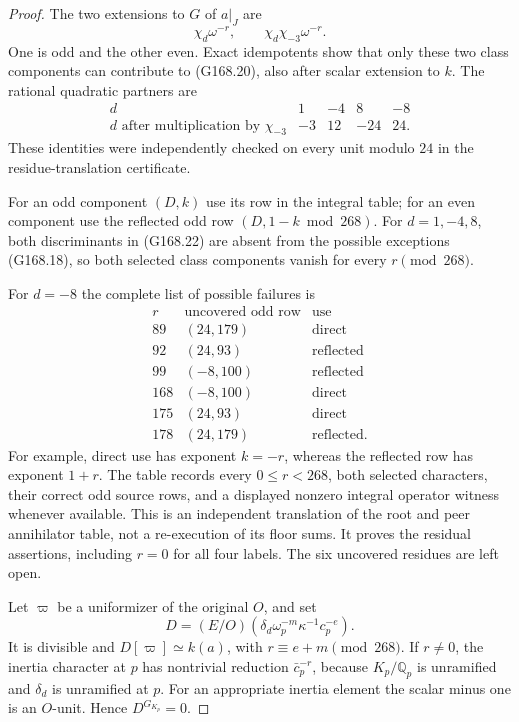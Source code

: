 \begin{proof}
The two extensions to $G$ of $a|_J$ are
\[
           \chi_d\omega^{-r},\qquad
                         \chi_d\chi_{-3}\omega^{-r}.
 \tag{G168.21}
\]
One is odd and the other even.
Exact idempotents show that only these two class components
can contribute to (G168.20), also after scalar extension to $k$.
The rational quadratic partners are
\[
 \begin{array}{c|rrrr}
 d&1&-4&8&-8\\ \hline
 d\text{ after multiplication by }\chi_{-3}&-3&12&-24&24.
 \end{array}
 \tag{G168.22}
\]
These identities were independently checked on every unit
modulo $24$ in the residue-translation certificate.

For an odd component $(D,k)$ use its row in the integral
table; for an even component use the reflected odd row
$(D,1-k\bmod268)$.
For $d=1,-4,8$, both discriminants in (G168.22) are absent
from the possible exceptions (G168.18), so both selected
class components vanish for every $r\pmod{268}$.

For $d=-8$ the complete list of possible failures is
\[
 \begin{array}{c|c|c}
 r&\text{uncovered odd row}&\text{use}\\ \hline
 89 &(24,179)&\text{direct}\\
 92 &(24,93)&\text{reflected}\\
 99 &(-8,100)&\text{reflected}\\
 168&(-8,100)&\text{direct}\\
 175&(24,93)&\text{direct}\\
 178&(24,179)&\text{reflected}.
 \end{array}
 \tag{G168.23}
\]
For example, direct use has exponent $k=-r$, whereas the
reflected row has exponent $1+r$.
The table records every $0\leq r<268$, both selected
characters, their correct odd source rows, and a displayed
nonzero integral operator witness whenever available.
This is an independent translation of the root and peer
annihilator table, not a re-execution of its floor sums.
It proves the residual assertions, including $r=0$ for all
four labels.  The six uncovered residues are left open.

Let $\varpi$ be a uniformizer of the original $O$, and set
\[
       D=(E/O)(\delta_d\omega_p^{-m}\kappa^{-1}c_p^{-e}).
 \tag{G168.24}
\]
It is divisible and $D[\varpi]\simeq k(a)$, with
$r\equiv e+m\pmod{268}$.
If $r\ne0$, the inertia character at $p$ has nontrivial
reduction $\bar c_p^{-r}$, because $K_p/\mathbb Q_p$ is
unramified and $\delta_d$ is unramified at $p$.
For an appropriate inertia element the scalar minus one is
an $O$-unit.  Hence $D^{G_{K_p}}=0$.


\end{proof}
